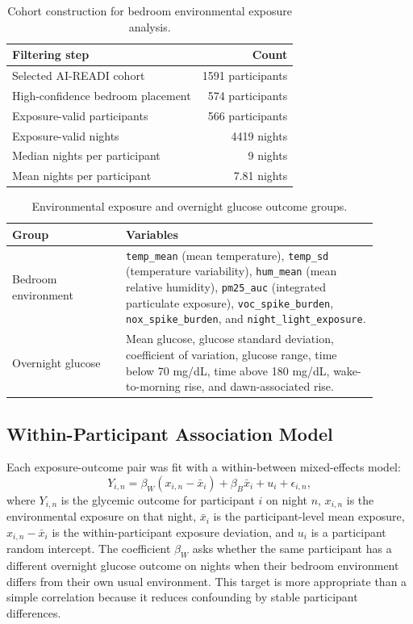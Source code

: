 \begin{table}[H]
\centering
\caption{Cohort construction for bedroom environmental exposure analysis.}
\begin{tabular}{l r}
\toprule
Filtering step & Count \\
\midrule
Selected AI-READI cohort & 1591 participants \\
High-confidence bedroom placement & 574 participants \\
Exposure-valid participants & 566 participants \\
Exposure-valid nights & 4419 nights \\
Median nights per participant & 9 nights \\
Mean nights per participant & 7.81 nights \\
\bottomrule
\end{tabular}
\label{tab:env_cohort_construction}
\end{table}

\begin{table}[H]
\centering
\caption{Environmental exposure and overnight glucose outcome groups.}
\begin{tabular}{p{0.28\linewidth} p{0.62\linewidth}}
\toprule
Group & Variables \\
\midrule
Bedroom environment &
\texttt{temp\_mean} (mean temperature), \texttt{temp\_sd} (temperature
variability), \texttt{hum\_mean} (mean relative humidity),
\texttt{pm25\_auc} (integrated particulate exposure),
\texttt{voc\_spike\_burden}, \texttt{nox\_spike\_burden}, and
\texttt{night\_light\_exposure}. \\
Overnight glucose &
Mean glucose, glucose standard deviation, coefficient of variation, glucose
range, time below 70 mg/dL, time above 180 mg/dL, wake-to-morning rise, and
dawn-associated rise. \\
\bottomrule
\end{tabular}
\label{tab:env_exposure_outcome_groups}
\end{table}

\subsection{Within-Participant Association Model}
\label{subsec:env_association_model}

Each exposure-outcome pair was fit with a within-between mixed-effects model:
\begin{equation}
Y_{i,n}
=
\beta_W (x_{i,n}-\bar{x}_i)
+
\beta_B \bar{x}_i
+
u_i
+
\epsilon_{i,n},
\label{eq:env_within_between}
\end{equation}
where $Y_{i,n}$ is the glycemic outcome for participant $i$ on night $n$,
$x_{i,n}$ is the environmental exposure on that night, $\bar{x}_i$ is the
participant-level mean exposure, $x_{i,n}-\bar{x}_i$ is the within-participant
exposure deviation, and $u_i$ is a participant random intercept. The
coefficient $\beta_W$ asks whether the same participant has a different
overnight glucose outcome on nights when their bedroom environment differs
from their own usual environment. This target is more appropriate than a simple
correlation because it reduces confounding by stable participant differences.

